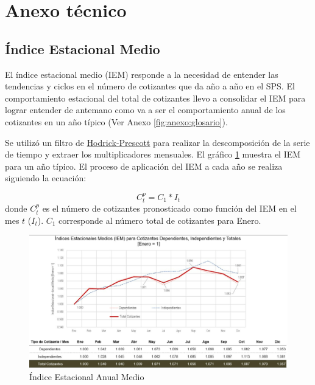 \section{Anexo técnico}
\subsection{Índice Estacional Medio}\label{section:anexo:IEM}

El índice estacional medio (IEM) responde a la necesidad de entender las tendencias y ciclos en el número de cotizantes que da año a año en el SPS. El comportamiento estacional del total de cotizantes llevo a consolidar el IEM para lograr entender de antemano como va a ser el comportamiento anual de los cotizantes en un año típico (Ver Anexo \ref{fig:anexo:glosario}).  

Se utilizó un filtro de \href{https://direct-mit-edu.ezproxy.library.wur.nl/rest/article-abstract/98/2/310/58328/The-Econometrics-of-the-Hodrick-Prescott-Filter?redirectedFrom=PDF}{Hodrick-Prescott} para realizar la descomposición de la serie de tiempo y extraer los multiplicadores mensuales. El gráfico \ref{fig:anexo:ano_tipo_multiplicadores} muestra el IEM para un año típico. El proceso de aplicación del IEM a cada año se realiza siguiendo la ecuación:

\[
C_t^p = C_{1} * I_{t}
\]
donde $C_t^p$ es el número de cotizantes pronosticado como función del IEM en el mes $t$ ($I_{t}$). $C_{1}$ corresponde al número total de cotizantes para Enero. 

\begin{figure}[!h]
    \centering
    \includegraphics[width = 13cm]{figures/anexo_tecnico/ano_tipo_multiplicadores.png}
    \caption{Índice Estacional Anual Medio}
    \label{fig:anexo:ano_tipo_multiplicadores}
\end{figure}
